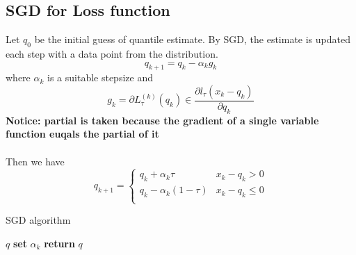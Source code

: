 \documentclass[11pt]{article}
\begin{document}
\subsection{SGD for Loss function}

Let $q_0$ be the initial guess of quantile estimate. 
By SGD, the estimate is updated each step with a data point from the distribution.
$$
q_{k+1} = q_k - \alpha_k g_k
$$
where $ \alpha_k $ is a suitable stepsize and 
$$
g_k = \partial L_{\tau}^{(k)}(q_k) \in \frac{\partial l_\tau(x_k - q_k)}{\partial q_k}
$$ 
\textbf{Notice: partial is taken because the gradient of a single variable function
euqals the partial of it}
\\\\
Then we have
$$
q_{k+1} = 
    \begin{cases}
        q_k + \alpha_k \tau               & x_k - q_k > 0\\
        q_k - \alpha_k (1-\tau)           & x_k - q_k \leq 0\\
    \end{cases}
$$

\begin{algorithm}
    \caption{SGD algorithm}\label{alg:SGD}
    \begin{algorithmic}[1]
         $q$                 
                              
                \State \textbf{set} $\alpha_k$  
                                  
                \Else                           {}
                \EndIf
            \EndFor
        \State \textbf{return} $q$              
    \end{algorithmic}
\end{algorithm}
\end{document}
